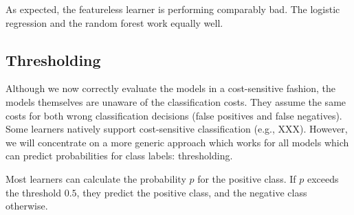 \documentclass[12pt,]{scrbook}
\newenvironment{Shaded}{}{}
\newcommand{\DataTypeTok}[1]{#1}
\newcommand{\DecValTok}[1]{#1}
\newcommand{\KeywordTok}[1]{\textcolor[rgb]{0.00,0.00,1.00}{#1}}
\newcommand{\NormalTok}[1]{#1}
\newcommand{\OperatorTok}[1]{#1}
\newcommand{\StringTok}[1]{\textcolor[rgb]{0.00,0.50,0.50}{#1}}
\begin{document}
\begin{Shaded}
\end{Shaded}

As expected, the featureless learner is performing comparably bad.
The logistic regression and the random forest work equally well.

\hypertarget{thresholding}{%
\subsection{Thresholding}\label{thresholding}}

Although we now correctly evaluate the models in a cost-sensitive fashion, the models themselves are unaware of the classification costs.
They assume the same costs for both wrong classification decisions (false positives and false negatives).
Some learners natively support cost-sensitive classification (e.g., XXX).
However, we will concentrate on a more generic approach which works for all models which can predict probabilities for class labels: thresholding.

Most learners can calculate the probability \(p\) for the positive class.
If \(p\) exceeds the threshold \(0.5\), they predict the positive class, and the negative class otherwise.
\end{document}
